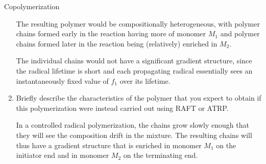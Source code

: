 \begin{activity}{Copolymerization}
\begin{exercises}
\begin{enumerate}
				\begin{solution}{}
					The resulting polymer would be compositionally heterogeneous, with polymer chains formed early in the reaction having more of monomer $M_1$ and polymer chains formed later in the reaction being (relatively) enriched in $M_2$.
					
					The individual chains would not have a significant gradient structure, since the radical lifetime is short and each propagating radical essentially sees an instantaneously fixed value of $f_1$ over its lifetime.
				\end{solution}
				
			\item Briefly describe the characteristics of the polymer that you expect to obtain if this polymerization were instead carried out using RAFT or ATRP.
			
				\begin{solution}{}
					In a controlled radical polymerization, the chains grow slowly enough that they will see the composition drift in the mixture.  The resulting chains will thus have a gradient structure that is enriched in monomer $M_1$ on the initiator end and in monomer $M_2$ on the terminating end.
				\end{solution}
				
		\end{enumerate}
	
	
\end{exercises}


%
%	


	
\end{activity}